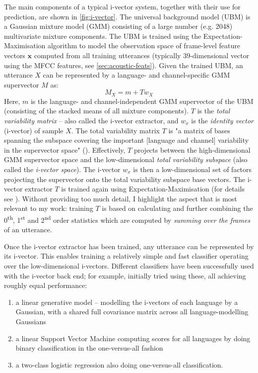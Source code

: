 \documentclass[bsc,frontabs,twoside,singlespacing,parskip,deptreport]{infthesis}
\begin{document}
{{    The main components of a typical i-vector system, together with their use for prediction, are shown in \autoref{fig:i-vector}. The universal background model (UBM) is a Gaussian mixture model (GMM) consisting of a large number (e.g. 2048) multivariate mixture components. The UBM is trained using the Expectation-Maximisation algorithm to model the observation space of frame-level feature vectors $\mathbf{x}$ computed from all training utterances (typically 39-dimensional vector using the MFCC features, see \autoref{sec:acoustic-feats}). Given the trained UBM, an utterance $X$ can be represented by a language- and channel-specific GMM supervector $M$ as:
    \begin{equation}
      \label{eq:supervector}
      M_X = m + Tw_X
    \end{equation}
    Here, $m$ is the language- and channel-independent GMM supervector of the UBM (consisting of the stacked means of all mixture components). $T$ is the \textit{total variability matrix} -- also called the i-vector extractor, and $w_x$ is the \textit{identity vector} (i-vector) of sample $X$. The total variability matrix $T$ is "a matrix of bases spanning the subspace covering the important [language and channel] variability in the supervector space" (\citeauthor[p.862]{Martinez_et_al_2011}). Effectively, $T$ projects between the high-dimensional GMM supervector space and the low-dimensional \textit{total variability subspace} (also called the \textit{i-vector space}). The i-vector $w_x$ is then a low-dimensional set of factors projecting the supervector onto the total variability subspace base vectors. The i-vector extractor $T$ is trained again using Expectation-Maximisation (for details see \citet[p. 100]{ivector_tutorial}). Without providing too much detail, I highlight the aspect that is most relevant to my work: training $T$ is based on calculating and further combining the 0\textsuperscript{th}, 1\textsuperscript{st} and 2\textsuperscript{nd} order statistics which are computed by \textit{summing over the frames} of an utterance.

    Once the i-vector extractor has been trained, any utterance can be represented by its i-vector. This enables training a relatively simple and fast classifier operating over the low-dimensional i-vectors. Different classifiers have been successfully used with the i-vector back end; for example, \citeauthor{Martinez_et_al_2011} initially tried using these, all achieving roughly equal performance:
    \begin{enumerate}
      \item {a linear generative model -- modelling the i-vectors of each language by a Gaussian, with a shared full covariance matrix across all language-modelling Gaussians}
      \item {a linear Support Vector Machine computing scores for all languages by doing binary classification in the one-versus-all fashion}
      \item {a two-class logistic regression also doing one-versus-all classification.}
    \end{enumerate}

}}
\end{document}
